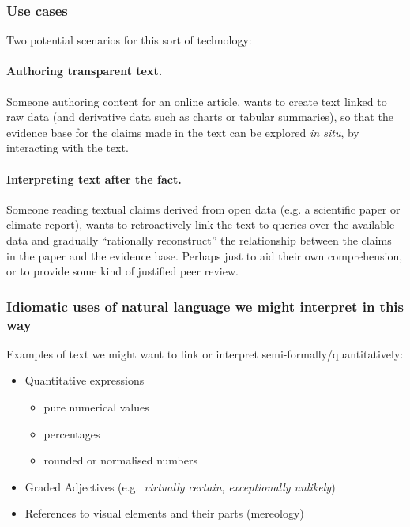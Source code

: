 \subsubsection{Use cases}
Two potential scenarios for this sort of technology:

\paragraph{Authoring transparent text.} Someone authoring content for an online article, wants to create text
linked to raw data (and derivative data such as charts or tabular summaries), so that the evidence base for
the claims made in the text can be explored \emph{in situ}, by interacting with the text.

\paragraph{Interpreting text after the fact.} Someone reading textual claims derived from open data (e.g. a
scientific paper or climate report), wants to retroactively link the text to queries over the available data
and gradually ``rationally reconstruct'' the relationship between the claims in the paper and the evidence
base. Perhaps just to aid their own comprehension, or to provide some kind of justified peer review.

\subsubsection{Idiomatic uses of natural language we might interpret in this way}

Examples of text we might want to link or interpret semi-formally/quantitatively:

\begin{itemize}
\item Quantitative expressions
\begin{itemize}
   \item pure numerical values
   \item percentages
   \item rounded or normalised numbers
\end{itemize}
\item Graded Adjectives (e.g.~\emph{virtually certain}, \emph{exceptionally unlikely})
\item References to visual elements and their parts (mereology)
\end{itemize}

